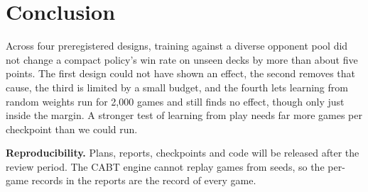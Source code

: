 \documentclass[conference]{IEEEtran}
\begin{document}
\section{Conclusion}

Across four preregistered designs, training against a diverse opponent pool did not change a compact policy's win rate on unseen decks by more than about five points. The first design could not have shown an effect, the second removes that cause, the third is limited by a small budget, and the fourth lets learning from random weights run for 2,000 games and still finds no effect, though only just inside the margin. A stronger test of learning from play needs far more games per checkpoint than we could run.

\textbf{Reproducibility.} Plans, reports, checkpoints and code will be released after the review period. The CABT engine cannot replay games from seeds, so the per-game records in the reports are the record of every game.



\end{document}

